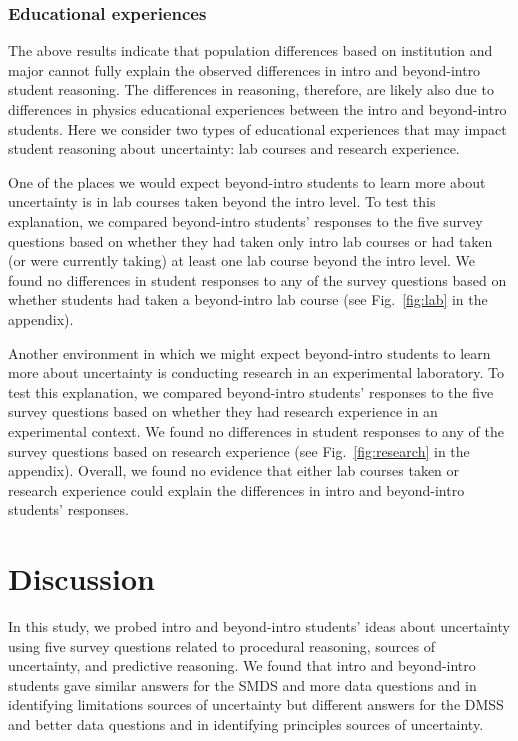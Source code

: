 \documentclass[english,aps,prstper,reprint,showpacs,longbibliography,superscriptaddress,nofootinbib]{revtex4-2}
\begin{document}
\subsubsection{Educational experiences}

The above results indicate that population differences based on institution and major cannot fully explain the observed differences in intro and beyond-intro student reasoning. The differences in reasoning, therefore, are likely also due to differences in physics educational experiences between the intro and beyond-intro students. Here we consider two types of educational experiences that may impact student reasoning about uncertainty: lab courses and research experience.

One of the places we would expect beyond-intro students to learn more about uncertainty is in lab courses taken beyond the intro level. To test this explanation, we compared beyond-intro students' responses to the five survey questions based on whether they had taken only intro lab courses or had taken (or were currently taking) at least one lab course beyond the intro level. We found no differences in student responses to any of the survey questions based on whether students had taken a beyond-intro lab course (see Fig.~\ref{fig:lab} in the appendix).

Another environment in which we might expect beyond-intro students to learn more about uncertainty is conducting research in an experimental laboratory. To test this explanation, we compared beyond-intro students' responses to the five survey questions based on whether they had research experience in an experimental context. We found no differences in student responses to any of the survey questions based on research experience (see Fig.~\ref{fig:research} in the appendix). Overall, we found no evidence that either lab courses taken or research experience could explain the differences in intro and beyond-intro students' responses.

\section{Discussion}

In this study, we probed intro and beyond-intro students' ideas about uncertainty using five survey questions related to procedural reasoning, sources of uncertainty, and predictive reasoning. We found that intro and beyond-intro students gave similar answers for the SMDS and more data questions and in identifying limitations sources of uncertainty but different answers for the DMSS and better data questions and in identifying principles sources of uncertainty.
\end{document}

